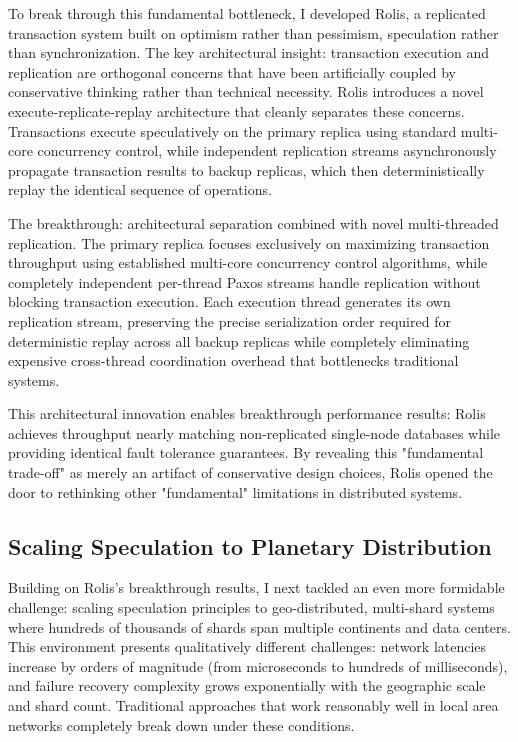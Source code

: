 \documentclass[11pt,letterpaper]{article}
\begin{document}
To break through this fundamental bottleneck, I developed Rolis, a replicated transaction system built on optimism rather than pessimism, speculation rather than synchronization. The key architectural insight: transaction execution and replication are orthogonal concerns that have been artificially coupled by conservative thinking rather than technical necessity. Rolis introduces a novel execute-replicate-replay architecture that cleanly separates these concerns. Transactions execute speculatively on the primary replica using standard multi-core concurrency control, while independent replication streams asynchronously propagate transaction results to backup replicas, which then deterministically replay the identical sequence of operations.

The breakthrough: architectural separation combined with novel multi-threaded replication.
The primary replica focuses exclusively on maximizing transaction throughput using established multi-core concurrency control algorithms, while completely independent per-thread Paxos streams handle replication without blocking transaction execution. Each execution thread generates its own replication stream, preserving the precise serialization order required for deterministic replay across all backup replicas while completely eliminating expensive cross-thread coordination overhead that bottlenecks traditional systems.

This architectural innovation enables breakthrough performance results: Rolis achieves throughput nearly matching non-replicated single-node databases while providing identical fault tolerance guarantees. 
By revealing this "fundamental trade-off" as merely an artifact of conservative design choices, Rolis opened the door to rethinking other "fundamental" limitations in distributed systems.

\subsection{Scaling Speculation to Planetary Distribution}
Building on Rolis's breakthrough results, I next tackled an even more formidable challenge: scaling speculation principles to geo-distributed, multi-shard systems where hundreds of thousands of shards span multiple continents and data centers. This environment presents qualitatively different challenges: network latencies increase by orders of magnitude (from microseconds to hundreds of milliseconds), and failure recovery complexity grows exponentially with the geographic scale and shard count. Traditional approaches that work reasonably well in local area networks completely break down under these conditions.
\end{document}
